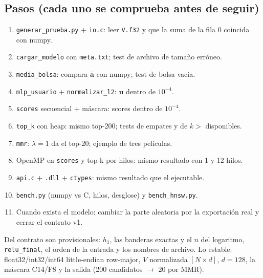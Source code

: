 \documentclass[a4paper,11pt]{article}
\newcommand{\cod}[1]{\texttt{#1}}
\begin{document}
\subsection{Pasos (cada uno se comprueba antes de seguir)}
\begin{enumerate}
  \item \cod{generar\_prueba.py} + \cod{io.c}: leer \cod{V.f32} y que la suma de la fila 0 coincida con numpy.
  \item \cod{cargar\_modelo} con \cod{meta.txt}; test de archivo de tamaño erróneo.
  \item \cod{media\_bolsa}: compara $\bar{\mathbf{a}}$ con numpy; test de bolsa vacía.
  \item \cod{mlp\_usuario} + \cod{normalizar\_l2}: $\mathbf{u}$ dentro de $10^{-4}$.
  \item \cod{scores} secuencial + máscara: scores dentro de $10^{-4}$.
  \item \cod{top\_k} con heap: mismo top-200; tests de empates y de $k >$ disponibles.
  \item \cod{mmr}: $\lambda = 1$ da el top-20; ejemplo de tres películas.
  \item OpenMP en \cod{scores} y top-k por hilos: mismo resultado con 1 y 12 hilos.
  \item \cod{api.c} + \cod{.dll} + \cod{ctypes}: mismo resultado que el ejecutable.
  \item \cod{bench.py} (numpy vs C, hilos, desglose) y \cod{bench\_hnsw.py}.
  \item Cuando exista el modelo: cambiar la parte aleatoria por la exportación real y cerrar el contrato v1.
\end{enumerate}

\begin{idea}
Del contrato son provisionales: $h_1$, las banderas exactas y el $n$ del logaritmo, \cod{relu\_final}, el orden de
la entrada y los nombres de archivo. Lo estable: float32/int32/int64 little-endian row-major, $V$ normalizada
$[N\times d]$, $d = 128$, la máscara C14/F8 y la salida (200 candidatos $\to$ 20 por MMR).
\end{idea}
\end{document}

